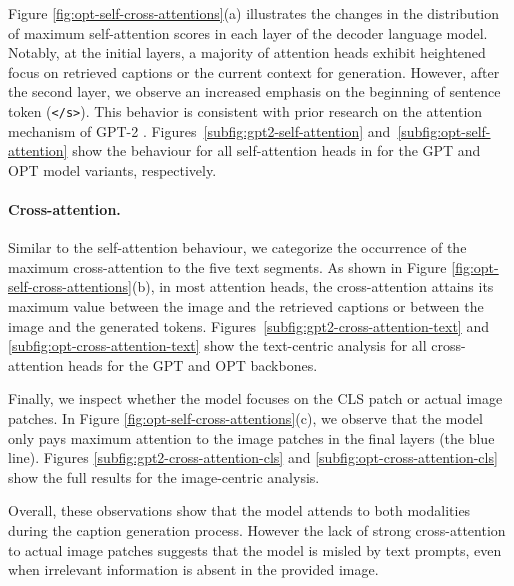 Figure \ref{fig:opt-self-cross-attentions}(a) illustrates the 
changes in the distribution of maximum self-attention scores in each layer of the decoder language model. 
Notably, at the initial layers, a majority of attention heads exhibit heightened focus on retrieved captions or the current context for generation. However, after the second layer, we observe an increased emphasis on the beginning of sentence token (\texttt{</s>}). This behavior is consistent with prior research on the attention mechanism of GPT-2 \cite{gpt2-analyzing}. Figures~\ref{subfig:gpt2-self-attention} and~\ref{subfig:opt-self-attention} show the behaviour for all self-attention heads in for the GPT and OPT model variants, respectively.

\paragraph{Cross-attention.}




Similar to the self-attention behaviour, we categorize the occurrence of the maximum cross-attention to the five text segments.
As shown in Figure \ref{fig:opt-self-cross-attentions}(b), in most attention heads, the cross-attention attains its maximum value between the image and the retrieved captions or between the image and the generated tokens. Figures~\ref{subfig:gpt2-cross-attention-text} and \ref{subfig:opt-cross-attention-text} show the text-centric analysis for all cross-attention heads for the GPT and OPT backbones.

Finally, we inspect whether the model focuses on the \textsc{CLS} patch or actual image patches. In Figure \ref{fig:opt-self-cross-attentions}(c), we observe that the model only pays maximum attention to the image patches in the final layers (the blue line). Figures \ref{subfig:gpt2-cross-attention-cls} and \ref{subfig:opt-cross-attention-cls} show the full results for the image-centric analysis. 

Overall, these observations show that the model attends to both modalities during the caption generation process. However the lack of strong cross-attention to actual image patches suggests that the model is misled by text prompts, even when irrelevant information is absent in the provided image.










